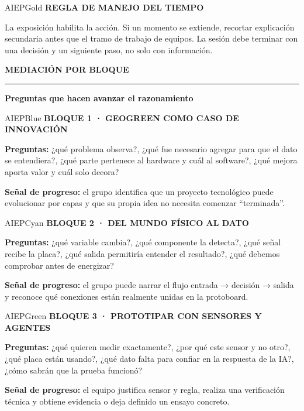 \documentclass[10pt,a4paper]{article}
\newcommand{\kicker}[1]{%
  {\color{AIEPRed}\scriptsize\bfseries\MakeUppercase{#1}}\par\vspace{2.5mm}
  {\color{AIEPRed}\rule{13mm}{1.2pt}}\vspace{3mm}
}
\newcommand{\labeltext}[1]{%
  {\scriptsize\bfseries\color{AIEPSlate}\MakeUppercase{#1}}\par\vspace{1.2mm}
}
\begin{document}
\vspace{4mm}
\begin{softcard}{AIEPGold}
\labeltext{Regla de manejo del tiempo}
La exposición habilita la acción. Si un momento se extiende, recortar explicación secundaria antes
que el tramo de trabajo de equipos. La sesión debe terminar con una decisión y un siguiente paso,
no solo con información.
\end{softcard}

\newpage
\kicker{Mediación por bloque}
{\LARGE\bfseries\color{AIEPNavy}Preguntas que hacen avanzar el razonamiento}\par
\vspace{4mm}

\begin{softcard}{AIEPBlue}
\labeltext{Bloque 1 · GeoGreen como caso de innovación}
\textbf{Preguntas:} ¿qué problema observa?, ¿qué fue necesario agregar para que el dato se entendiera?,
¿qué parte pertenece al hardware y cuál al software?, ¿qué mejora aporta valor y cuál solo decora?\par
\textbf{Señal de progreso:} el grupo identifica que un proyecto tecnológico puede evolucionar por
capas y que su propia idea no necesita comenzar “terminada”.
\end{softcard}

\begin{softcard}{AIEPCyan}
\labeltext{Bloque 2 · Del mundo físico al dato}
\textbf{Preguntas:} ¿qué variable cambia?, ¿qué componente la detecta?, ¿qué señal recibe la placa?,
¿qué salida permitiría entender el resultado?, ¿qué debemos comprobar antes de energizar?\par
\textbf{Señal de progreso:} el grupo puede narrar el flujo entrada → decisión → salida y reconoce
qué conexiones están realmente unidas en la protoboard.
\end{softcard}

\begin{softcard}{AIEPGreen}
\labeltext{Bloque 3 · Prototipar con sensores y agentes}
\textbf{Preguntas:} ¿qué quieren medir exactamente?, ¿por qué este sensor y no otro?, ¿qué placa
están usando?, ¿qué dato falta para confiar en la respuesta de la IA?, ¿cómo sabrán que la prueba funcionó?\par
\textbf{Señal de progreso:} el equipo justifica sensor y regla, realiza una verificación técnica y
obtiene evidencia o deja definido un ensayo concreto.
\end{softcard}
\end{document}
